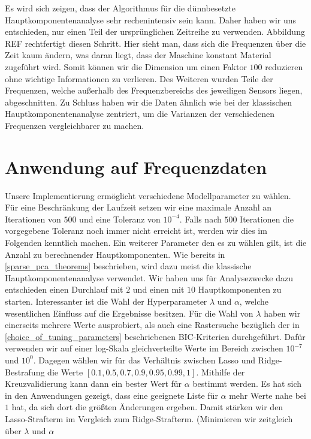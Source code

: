 Es wird sich zeigen, dass der Algorithmus für die dünnbesetzte Hauptkomponentenanalyse sehr rechenintensiv sein kann. Daher haben wir uns entschieden, nur einen Teil der ursprünglichen Zeitreihe zu verwenden. Abbildung REF rechtfertigt diesen Schritt. Hier sieht man, dass sich die Frequenzen über die Zeit kaum ändern, was daran liegt, dass der Maschine konstant Material zugeführt wird. Somit können wir die Dimension um einen Faktor $100$ reduzieren ohne wichtige Informationen zu verlieren. Des Weiteren wurden Teile der Frequenzen, welche außerhalb des Frequenzbereichs des jeweiligen Sensors liegen, abgeschnitten. Zu Schluss haben wir die Daten ähnlich wie bei der klassischen Hauptkomponentenanalyse zentriert, um die Varianzen der verschiedenen Frequenzen vergleichbarer zu machen.




\section{Anwendung auf Frequenzdaten}
\label{application_frequency_data}

Unsere Implementierung ermöglicht verschiedene Modellparameter zu wählen. Für eine Beschränkung der Laufzeit setzen wir eine maximale Anzahl an Iterationen von $500$ und eine Toleranz von $10^{-4}$. Falls nach $500$ Iterationen die vorgegebene Toleranz noch immer nicht erreicht ist, werden wir dies im Folgenden kenntlich machen. Ein weiterer Parameter den es zu wählen gilt, ist die Anzahl zu berechnender Hauptkomponenten. Wie bereits in \ref{sparse_pca_theorems} beschrieben, wird dazu meist die klassische Hauptkomponentenanalyse verwendet. Wir haben uns für Analysezwecke dazu entschieden einen Durchlauf mit $2$ und einen mit $10$ Hauptkomponenten zu starten. Interessanter ist die Wahl der Hyperparameter $\lambda$ und $\alpha$, welche wesentlichen Einfluss auf die Ergebnisse besitzen. Für die Wahl von $\lambda$ haben wir einerseits mehrere Werte ausprobiert, als auch eine Rastersuche bezüglich der in \ref{choice_of_tuning_parameters} beschriebenen BIC-Kriterien durchgeführt. Dafür verwenden wir auf einer log-Skala gleichverteilte Werte im Bereich zwischen $10^{-7}$ und $10^0$. Dagegen wählen wir für das Verhältnis zwischen Lasso und Ridge-Bestrafung die Werte $[0.1, 0.5, 0.7, 0.9, 0.95, 0.99, 1]$. Mithilfe der Kreuzvalidierung kann dann ein bester Wert für $\alpha$ bestimmt werden. Es hat sich in den Anwendungen gezeigt, dass eine geeignete Liste für $\alpha$ mehr Werte nahe bei $1$ hat, da sich dort die größten Änderungen ergeben. Damit stärken wir den Lasso-Strafterm im Vergleich zum Ridge-Strafterm. (Minimieren wir zeitgleich über $\lambda$ und $\alpha$

